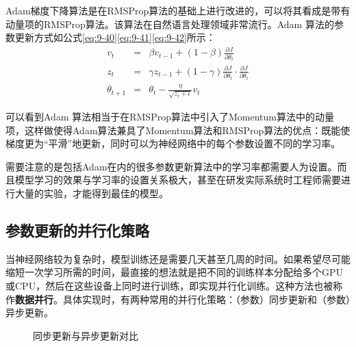 \parinterval  Adam梯度下降算法是在RMSProp算法的基础上进行改进的，可以将其看成是带有动量项的RMSProp算法。该算法在自然语言处理领域非常流行。Adam 算法的参数更新方式如公式\eqref{eq:9-40}\eqref{eq:9-41}\eqref{eq:9-42}所示：
\begin{eqnarray}
v_t&=&\beta v_{t-1}+(1-\beta)\frac{\partial J}{\partial {\theta}_t}
\label{eq:9-40}\\
z_t&=&\gamma z_{t-1}+(1-\gamma) \frac{\partial J}{\partial {\theta}_t} \cdot  \frac{\partial J}{\partial {\theta}_t}
\label{eq:9-41}\\
{\theta}_{t+1}&=&{\theta}_t-\frac{\eta}{\sqrt{z_t+\epsilon}} v_t
\label{eq:9-42}
\end{eqnarray}

\noindent 可以看到Adam 算法相当于在RMSProp算法中引入了Momentum算法中的动量项，这样做使得Adam算法兼具了Momentum算法和RMSProp算法的优点：既能使梯度更为“平滑”地更新，同时可以为神经网络中的每个参数设置不同的学习率。

\parinterval  需要注意的是包括Adam在内的很多参数更新算法中的学习率都需要人为设置。而且模型学习的效果与学习率的设置关系极大，甚至在研发实际系统时工程师需要进行大量的实验，才能得到最佳的模型。


\subsection{参数更新的并行化策略}

\parinterval  当神经网络较为复杂时，模型训练还是需要几天甚至几周的时间。如果希望尽可能缩短一次学习所需的时间，最直接的想法就是把不同的训练样本分配给多个GPU 或CPU，然后在这些设备上同时进行训练，即实现并行化训练。这种方法也被称作{\small\sffamily\bfseries{数据并行}}。具体实现时，有两种常用的并行化策略：（参数）同步更新和（参数）异步更新。

\begin{figure}[htp]
\centering

\caption{同步更新与异步更新对比}
\label{fig:9-47}
\end {figure}

